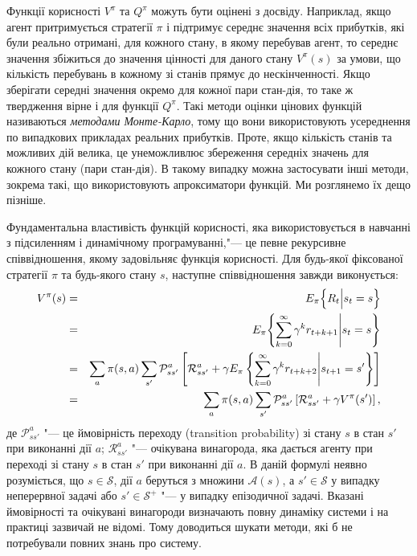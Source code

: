 \documentclass[a4paper,10pt]{article}
\begin{document}
Функції корисності $V^\pi$ та $Q^\pi$ можуть бути оцінені з досвіду. Наприклад, якщо агент притримується стратегії $\pi$ і підтримує середнє значення всіх прибутків, які були реально отримані, для кожного стану, в якому перебував агент, то середнє значення збіжиться до значення цінності для даного стану $V^\pi(s)$ за умови, що кількість перебувань в кожному зі станів прямує до нескінченності. Якщо зберігати середні значення окремо для кожної пари стан-дія, то таке ж твердження вірне і для функції $Q^\pi$. Такі методи оцінки цінових функцій називаються \emph{методами Монте-Карло}, тому що вони використовують усереднення по випадкових прикладах реальних прибутків. Проте, якщо кількість станів та можливих дій велика, це унеможливлює збереження середніх значень для кожного стану (пари стан-дія). В такому випадку можна застосувати інші методи, зокрема такі, що використовують апроксиматори функцій. Ми розглянемо їх дещо пізніше.

Фундаментальна властивість функцій корисності, яка використовується в навчанні з підсиленням і динамічному програмуванні,"--- це певне рекурсивне співвідношення, якому задовільняє функція корисності. Для будь-якої фіксованої стратегії $\pi$ та будь-якого стану $s$, наступне співвідношення завжди виконується:
\begin{eqnarray}
V^\pi(s) & = & E_\pi \Bigl\{R_t \Big| s_t = s \Bigr\} \nonumber\\
			& = & E_\pi \Biggl\{\sum_{k=0}^{\infty}\gamma^k r_{t+k+1} \Bigg| s_t = s \Biggr\} \nonumber\\
			& = & \sum_a \pi(s,a)\sum_{s'}\mathcal{P}^a_{ss'} \left[ \mathcal{R}^a_{ss'}+\gamma E_\pi \left\{\sum_{k=0}^{\infty}\gamma^k r_{t+k+2} \Bigg| s_{t+1} = s' \right\} \right] \nonumber\\
			& = & \sum_a \pi(s,a)\sum_{s'}\mathcal{P}^a_{ss'} \left[ \mathcal{R}^a_{ss'}+\gamma V^\pi(s') \right],
\label{Bellman_eq}
\end{eqnarray}
де $\mathcal{P}^a_{ss'}$ "--- це ймовірність переходу (transition probability) зі стану $s$ в стан $s'$ при виконанні дії $a$; $\mathcal{R}^a_{ss'}$ "--- очікувана винагорода, яка дається агенту при переході зі стану $s$ в стан $s'$ при виконанні дії $a$. В даній формулі неявно розуміється, що $s \in \mathcal{S}$, дії $a$ беруться з множини $\mathcal{A}(s)$, а $s' \in \mathcal{S}$ у випадку неперервної задачі або $s' \in \mathcal{S^+}$ "--- у випадку епізодичної задачі. Вказані ймовірності та очікувані винагороди визначають повну динаміку системи і на практиці зазвичай не відомі. Тому доводиться шукати методи, які б не потребували повних знань про систему.
\end{document}
